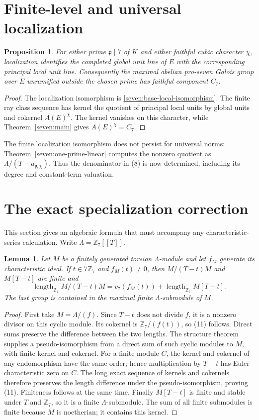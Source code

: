 \documentclass[11pt]{article}
\newtheorem{proposition}[theorem]{Proposition}
\newtheorem{lemma}[theorem]{Lemma}
\newcommand{\Z}{\mathbb Z}\newcommand{\Q}{\mathbb Q}
\begin{document}
\section{Finite-level and universal localization}
\begin{proposition}\label{prop:seven-units}
For either prime $\mathfrak p\mid7$ of $K$ and either faithful cubic character $\chi$, localization identifies the completed global unit line of $E$ with the corresponding principal local unit line. Consequently the maximal abelian pro-seven Galois group over $E$ unramified outside the chosen prime has faithful component $C_7$.
\end{proposition}
\begin{proof}
The localization isomorphism is \eqref{seven:base-local-isomorphism}. The finite ray class sequence has kernel the quotient of principal local units by global units and cokernel $A(E)^\chi$. The kernel vanishes on this character, while Theorem~\ref{seven:main} gives $A(E)^\chi=C_7$.
\end{proof}
The finite localization isomorphism does not persist for universal norms: Theorem~\ref{seven:one-prime-linear} computes the nonzero quotient as $\Lambda/(T-a_{\mathfrak p,\chi})$. Thus the denominator in (8) is now determined, including its degree and constant-term valuation.

\section{The exact specialization correction}
This section gives an algebraic formula that must accompany any characteristic-series calculation. Write $\Lambda=\Z_7[[T]]$.

\begin{lemma}\label{lem:euler-specialization}
Let $M$ be a finitely generated torsion $\Lambda$-module and let $f_M$ generate its characteristic ideal. If $t\in7\Z_7$ and $f_M(t)\ne0$, then $M/(T-t)M$ and $M[T-t]$ are finite and
\[
 \operatorname{length}_{\Z_7}M/(T-t)M
 =v_7(f_M(t))+\operatorname{length}_{\Z_7}M[T-t].
\tag{11}
\]
The last group is contained in the maximal finite $\Lambda$-submodule of $M$.
\end{lemma}
\begin{proof}
First take $M=\Lambda/(f)$. Since $T-t$ does not divide $f$, it is a nonzero divisor on this cyclic module. Its cokernel is $\Z_7/(f(t))$, so (11) follows. Direct sums preserve the difference between the two lengths. The structure theorem supplies a pseudo-isomorphism from a direct sum of such cyclic modules to $M$, with finite kernel and cokernel. For a finite module $C$, the kernel and cokernel of any endomorphism have the same order; hence multiplication by $T-t$ has Euler characteristic zero on $C$. The long exact sequence of kernels and cokernels therefore preserves the length difference under the pseudo-isomorphism, proving (11). Finiteness follows at the same time. Finally $M[T-t]$ is finite and stable under $T$ and $\Z_7$, so it is a finite $\Lambda$-submodule. The sum of all finite submodules is finite because $M$ is noetherian; it contains this kernel.
\end{proof}
\end{document}
